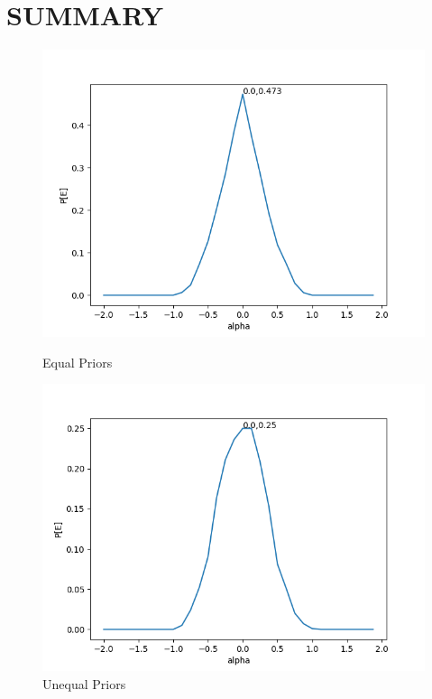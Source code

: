 \documentclass{article}
\begin{document}
\section{\MakeUppercase{Summary}}
\begin{figure}[!htb]
	\begin{minipage}{0.49\textwidth}
		\centering
		\includegraphics[width=1\linewidth]{../equalpriors/results.png}
		\caption{Equal Priors}
	\end{minipage}
	\begin{minipage}{0.49\textwidth}
		\centering
		\includegraphics[width=1\linewidth]{../unequalpriors/results.png}
		\caption{Unequal Priors}
	\end{minipage}
\end{figure}
\end{document}
